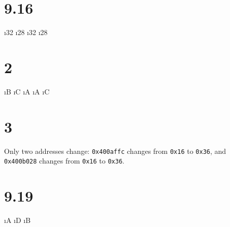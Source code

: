 \documentclass[fleqn]{article}
\begin{document}


\section*{9.16}

\bee

\i 32
\i 28
\i 32
\i 28

\ene

\section*{2}

\bee

\i B
\i C
\i A
\i A
\i C

\ene

\section*{3}

Only two addresses change: \texttt{0x400affc} changes from \texttt{0x16} to \texttt{0x36}, and \texttt{0x400b028} changes from \texttt{0x16} to \texttt{0x36}.

\section*{9.19}

\bee

\i A
\i D
\i B

\ene
\end{document}
